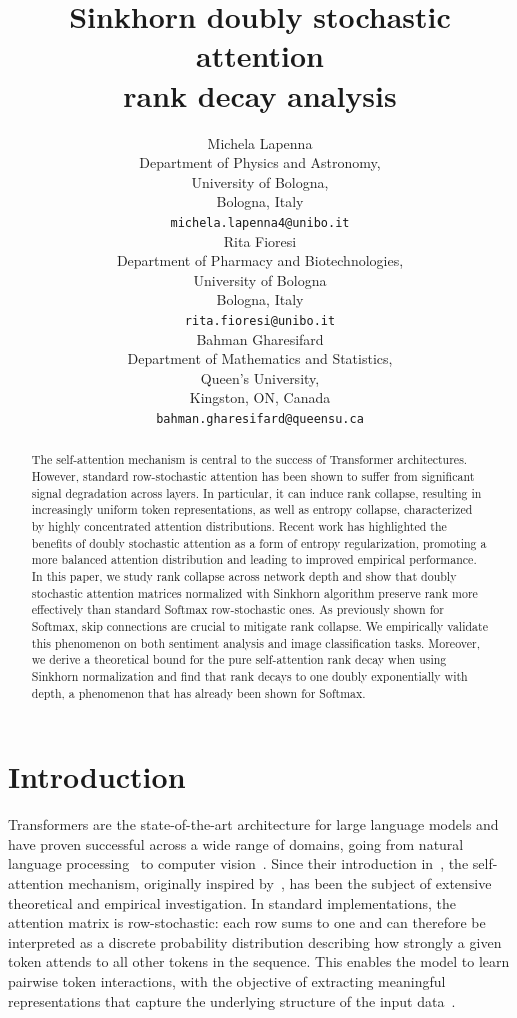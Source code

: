 \documentclass{article}
\title{Sinkhorn doubly stochastic attention \\rank decay analysis}
\author{
  Michela Lapenna \\
  Department of Physics and Astronomy, \\
  University of Bologna,  \\
  Bologna, Italy\\
  \texttt{michela.lapenna4@unibo.it} \\
  \And
  Rita Fioresi \\
  Department of Pharmacy and Biotechnologies,\\
  University of Bologna \\
  Bologna, Italy\\
  \texttt{rita.fioresi@unibo.it} \\
   \And
  Bahman Gharesifard \\
  Department of Mathematics and Statistics,\\
  Queen’s University, \\
  Kingston, ON, Canada \\
  \texttt{bahman.gharesifard@queensu.ca} \\
}
\theoremstyle{definition}
\theoremstyle{plain}
\begin{document}
\maketitle


\begin{abstract}
The self-attention mechanism is central to the success of Transformer architectures. However, standard row-stochastic attention has been shown to suffer from significant signal degradation across layers. In particular, it can induce rank collapse, resulting in increasingly uniform token representations, as well as entropy collapse, characterized by highly concentrated attention distributions. Recent work has highlighted the benefits of doubly stochastic attention as a form of entropy regularization, promoting a more balanced attention distribution and leading to improved empirical performance. In this paper, we study rank collapse across network depth and show that doubly stochastic attention matrices normalized with Sinkhorn algorithm preserve rank more effectively than standard Softmax row-stochastic ones. As previously shown for Softmax, skip connections are crucial to mitigate rank collapse. We empirically validate this phenomenon on both sentiment analysis and image classification tasks. Moreover, we derive a theoretical bound for the pure self-attention rank decay when using Sinkhorn normalization and find that rank decays to one doubly exponentially with depth, a phenomenon that has already been shown for Softmax.
\end{abstract}


\section{Introduction}

Transformers are the state-of-the-art architecture for large language models and have proven successful across a wide range of domains, going from natural language processing~\cite{tunstall2022nlp} to computer vision~\cite{dosovitskiy2021vit}. Since their introduction in~\cite{vaswani2017attention}, the self-attention mechanism, originally inspired by~\cite{Bahdanau}, has been the subject of extensive theoretical and empirical investigation. In standard implementations, the attention matrix is row-stochastic: each row sums to one and can therefore be interpreted as a discrete probability distribution describing how strongly a given token attends to all other tokens in the sequence. This enables the model to learn pairwise token interactions, with the objective of extracting meaningful representations that capture the underlying structure of the input data~\cite{khan}.
\end{document}

